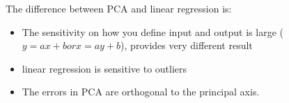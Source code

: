 \documentclass[a4paper,10pt]{article}
\begin{document}
The difference between PCA and linear regression is:
\begin{itemize}
    \item The sensitivity on how you define input and output is large ($y=ax+b or x = ay+b$), provides very different result
    \item linear regression is sensitive to outliers
    \item The errors in PCA are orthogonal to the principal axis.
\end{itemize}

\end{document}
